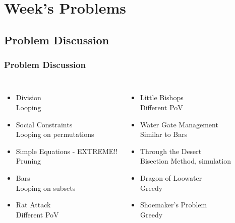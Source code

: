 \documentclass{beamer}
\begin{document}



\section{Week's Problems}
\subsection{Problem Discussion}
\begin{frame}
  \frametitle{Problem Discussion}
  \begin{columns}
    \begin{itemize}
    \item Division\\{\small Looping}
    \item Social Constraints\\{\small Looping on permutations}
    \item Simple Equations - EXTREME!!\\{\small Pruning}
    \item Bars\\{\small Looping on subsets}
    \item Rat Attack\\{\small Different PoV}
    \end{itemize}
    \begin{itemize}
    \item Little Bishops\\{\small Different PoV}
    \item Water Gate Management\\{\small Similar to Bars}
    \item Through the Desert\\{\small Bisection Method, simulation}
    \item Dragon of Loowater\\{\small Greedy}
    \item Shoemaker's Problem\\{\small Greedy}
    \end{itemize}
  \end{columns}
\end{frame}
\end{document}
